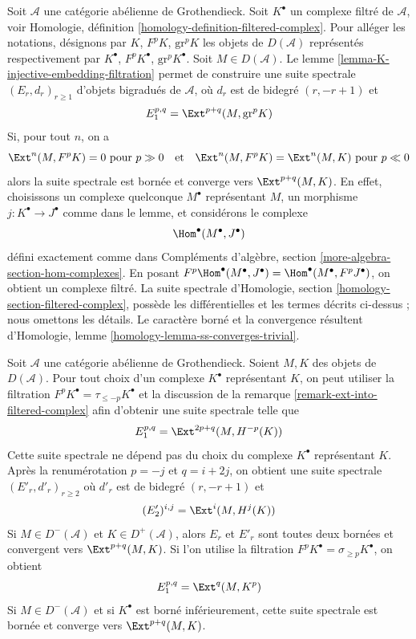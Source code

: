 \begin{remark}
\label{remark-ext-into-filtered-complex}
Soit $\mathcal{A}$ une catégorie abélienne de Grothendieck.
Soit $K^\bullet$ un complexe filtré de $\mathcal{A}$, voir
Homologie, définition \ref{homology-definition-filtered-complex}.
Pour alléger les notations, désignons par $K$, $F^pK$, $\text{gr}^pK$
les objets de $D(\mathcal{A})$ représentés respectivement par $K^\bullet$,
$F^pK^\bullet$, $\text{gr}^pK^\bullet$. Soit $M \in D(\mathcal{A})$.
Le lemme \ref{lemma-K-injective-embedding-filtration} permet de construire
une suite spectrale $(E_r, d_r)_{r \geq 1}$ d'objets bigradués de
$\mathcal{A}$, où $d_r$ est de bidegré $(r, -r + 1)$ et
$$
E_1^{p, q} = \Ext^{p + q}(M, \text{gr}^pK)
$$
Si, pour tout $n$, on a
$$
\Ext^n(M, F^pK) = 0 \text{ pour } p \gg 0
\quad\text{et}\quad
\Ext^n(M, F^pK) = \Ext^n(M, K) \text{ pour } p \ll 0
$$
alors la suite spectrale est bornée et converge vers $\Ext^{p + q}(M, K)$.
En effet, choisissons un complexe quelconque $M^\bullet$ représentant $M$,
un morphisme $j : K^\bullet \to J^\bullet$ comme dans le lemme, et considérons
le complexe
$$
\Hom^\bullet(M^\bullet, J^\bullet)
$$
défini exactement comme dans Compléments d'algèbre, section
\ref{more-algebra-section-hom-complexes}. En posant
$F^p\Hom^\bullet(M^\bullet, J^\bullet) =
\Hom^\bullet(M^\bullet, F^pJ^\bullet)$, on obtient un complexe filtré.
La suite spectrale d'Homologie, section
\ref{homology-section-filtered-complex}, possède les différentielles et les
termes décrits ci-dessus ; nous omettons les détails. Le caractère borné et la
convergence résultent d'Homologie, lemme
\ref{homology-lemma-ss-converges-trivial}.
\end{remark}

\begin{remark}
\label{remark-spectral-sequences-ext}
Soit $\mathcal{A}$ une catégorie abélienne de Grothendieck.
Soient $M, K$ des objets de $D(\mathcal{A})$.
Pour tout choix d'un complexe $K^\bullet$ représentant $K$, on peut utiliser
la filtration $F^pK^\bullet = \tau_{\leq -p}K^\bullet$ et la discussion de la
remarque \ref{remark-ext-into-filtered-complex} afin d'obtenir une suite
spectrale telle que
$$
E_1^{p, q} = \Ext^{2p + q}(M, H^{-p}(K))
$$
Cette suite spectrale ne dépend pas du choix du complexe $K^\bullet$
représentant $K$. Après la renumérotation $p = -j$ et $q = i + 2j$, on
obtient une suite spectrale $(E'_r, d'_r)_{r \geq 2}$ où $d'_r$ est de
bidegré $(r, -r + 1)$ et
$$
(E'_2)^{i, j} = \Ext^i(M, H^j(K))
$$
Si $M \in D^-(\mathcal{A})$ et $K \in D^+(\mathcal{A})$, alors $E_r$ et
$E'_r$ sont toutes deux bornées et convergent vers $\Ext^{p + q}(M, K)$.
Si l'on utilise la filtration $F^pK^\bullet = \sigma_{\geq p}K^\bullet$,
on obtient
$$
E_1^{p, q} = \Ext^q(M, K^p)
$$
Si $M \in D^-(\mathcal{A})$ et si $K^\bullet$ est borné inférieurement,
cette suite spectrale est bornée et converge vers $\Ext^{p + q}(M, K)$.
\end{remark}

